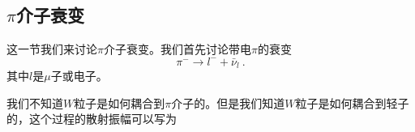 
\subsection*{$\pi$介子衰变} 
这一节我们来讨论$\pi$介子衰变。我们首先讨论带电$\pi$的衰变 
\begin{equation}
\pi^- \rightarrow l^- + \bar \nu_l~.
\end{equation}
其中$l$是$\mu$子或电子。

我们不知道$W$粒子是如何耦合到$\pi$介子的。但是我们知道$W$粒子是如何耦合到轻子的，这个过程的散射振幅可以写为

